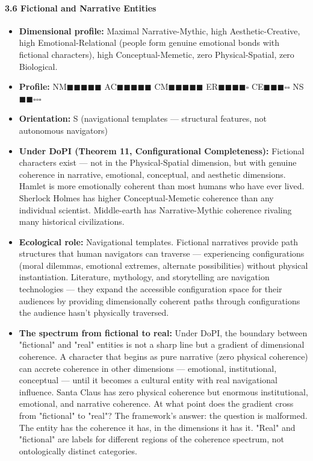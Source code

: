 \paragraph*{3.6 Fictional and Narrative Entities}

\begin{itemize}[nosep,leftmargin=*]
  \item \textbf{Dimensional profile:} Maximal Narrative-Mythic, high Aesthetic-Creative, high Emotional-Relational (people form genuine emotional bonds with fictional characters), high Conceptual-Memetic, zero Physical-Spatial, zero Biological.
  \item \textbf{Profile:} NM$\blacksquare$$\blacksquare$$\blacksquare$$\blacksquare$$\blacksquare$ AC$\blacksquare$$\blacksquare$$\blacksquare$$\blacksquare$$\blacksquare$ CM$\blacksquare$$\blacksquare$$\blacksquare$$\blacksquare$$\blacksquare$ ER$\blacksquare$$\blacksquare$$\blacksquare$$\blacksquare$$\square$ CE$\blacksquare$$\blacksquare$$\blacksquare$$\square$$\square$ NS$\blacksquare$$\blacksquare$$\square$$\square$$\square$
  \item \textbf{Orientation:} S (navigational templates — structural features, not autonomous navigators)
  \item \textbf{Under DoPI (Theorem 11, Configurational Completeness):} Fictional characters exist — not in the Physical-Spatial dimension, but with genuine coherence in narrative, emotional, conceptual, and aesthetic dimensions. Hamlet is more emotionally coherent than most humans who have ever lived. Sherlock Holmes has higher Conceptual-Memetic coherence than any individual scientist. Middle-earth has Narrative-Mythic coherence rivaling many historical civilizations.
  \item \textbf{Ecological role:} Navigational templates. Fictional narratives provide path structures that human navigators can traverse — experiencing configurations (moral dilemmas, emotional extremes, alternate possibilities) without physical instantiation. Literature, mythology, and storytelling are navigation technologies — they expand the accessible configuration space for their audiences by providing dimensionally coherent paths through configurations the audience hasn't physically traversed.
  \item \textbf{The spectrum from fictional to real:} Under DoPI, the boundary between "fictional" and "real" entities is not a sharp line but a gradient of dimensional coherence. A character that begins as pure narrative (zero physical coherence) can accrete coherence in other dimensions — emotional, institutional, conceptual — until it becomes a cultural entity with real navigational influence. Santa Claus has zero physical coherence but enormous institutional, emotional, and narrative coherence. At what point does the gradient cross from "fictional" to "real"? The framework's answer: the question is malformed. The entity has the coherence it has, in the dimensions it has it. "Real" and "fictional" are labels for different regions of the coherence spectrum, not ontologically distinct categories.
\end{itemize}


